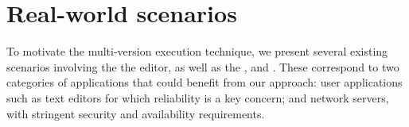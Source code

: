 \section{Real-world scenarios}
\label{multi-version:scenarios}

To motivate the multi-version execution technique, we present several existing
scenarios involving the the \vim editor, as well as the \lighttpd, and \redis.
These correspond to two categories of applications that could benefit from our
approach: user applications such as text editors for which reliability is a key
concern; and network servers, with stringent security and availability
requirements.




